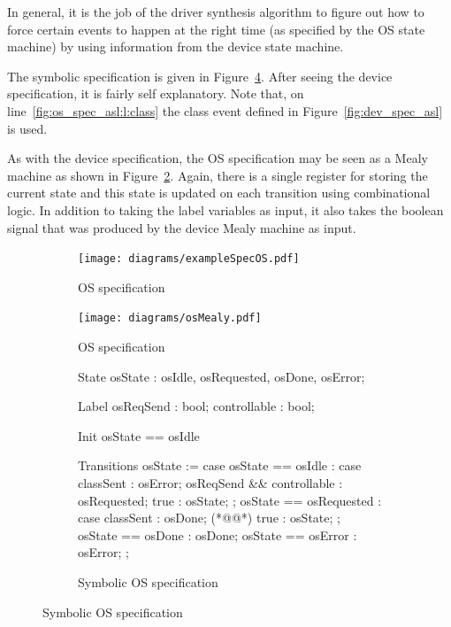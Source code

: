 In general, it is the job of the driver synthesis algorithm to figure out how to force certain events to happen at the right time (as specified by the OS state machine) by using information from the device state machine. 

The symbolic specification is given in Figure~\ref{fig:os_spec_asl}. After seeing the device specification, it is fairly self explanatory. Note that, on line~\ref{fig:os_spec_asl:l:class} the class event defined in Figure~\ref{fig:dev_spec_asl} is used.

As with the device specification, the OS specification may be seen as a Mealy machine as shown in Figure~\ref{fig:os_spec_mealy}. Again, there is a single register for storing the current state and this state is updated on each transition using combinational logic. In addition to taking the label variables as input, it also takes the  boolean signal that was produced by the device Mealy machine as input. 

\begin{figure}
\centering
\begin{subfigure}[t]{0.47\textwidth}
\texttt{[image: diagrams/exampleSpecOS.pdf]}
\caption{OS specification}
\label{fig:os_spec}
\end{subfigure}
\hfill
\begin{subfigure}[t]{0.47\textwidth}
\centering
\texttt{[image: diagrams/osMealy.pdf]}
\caption{OS specification}
\label{fig:os_spec_mealy}
\end{subfigure}
\par\bigskip
\begin{subfigure}[b]{\textwidth}
\centering
\begin{asllisting}
State
osState  : {osIdle, osRequested, osDone, osError};

Label
osReqSend    : bool;
controllable : bool;

Init
osState == osIdle 

Transitions
osState := case {
    osState == osIdle :
        case {
            classSent                 : osError;
            osReqSend && controllable : osRequested;
            true                      : osState;
        };
    osState == osRequested :
        case {
            classSent : osDone; (*@\label{fig:os_spec_asl:l:class}@*)
            true      : osState;
        };
    osState == osDone  : osDone;
    osState == osError : osError;
};
\end{asllisting}
\caption{Symbolic OS specification}
\label{fig:os_spec_asl}
\end{subfigure}
\end{figure}

